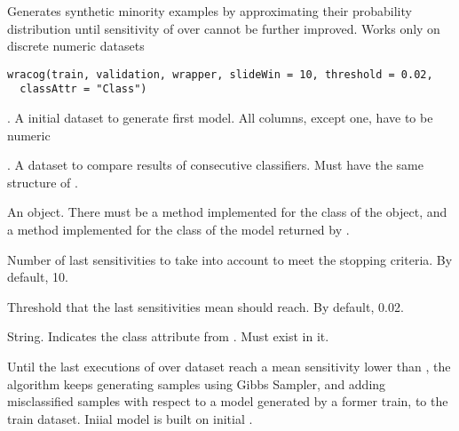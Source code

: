 %
\begin{Description}\relax
Generates synthetic minority examples by approximating their probability
distribution until sensitivity of  over 
cannot be further improved. Works only on discrete numeric datasets
\end{Description}
%
\begin{Usage}
\begin{verbatim}
wracog(train, validation, wrapper, slideWin = 10, threshold = 0.02,
  classAttr = "Class")
\end{verbatim}
\end{Usage}
%
\begin{Arguments}
\begin{ldescription}
\item[\code{train}] . A initial dataset to generate first model.
All columns, except  one, have to be numeric

\item[\code{validation}] . A dataset to compare results of
consecutive classifiers. Must have the same structure of .

\item[\code{wrapper}] An  object. There must be a method
 implemented for the class of the object, and a
 method implemented for the class of the model
returned by .

\item[\code{slideWin}] Number of last sensitivities to take into account to meet the
stopping criteria. By default, 10.

\item[\code{threshold}] Threshold that the last  sensitivities mean
should reach. By default, 0.02.

\item[\code{classAttr}] String. Indicates the class attribute from .
Must exist in it.
\end{ldescription}
\end{Arguments}
%
\begin{Details}\relax
Until the last  executions of  over
 dataset reach a mean sensitivity lower than
, the algorithm keeps generating samples using Gibbs Sampler,
and adding misclassified samples with respect to a model generated by a
former train, to the train dataset. Iniial model is built on initial
.
\end{Details}
